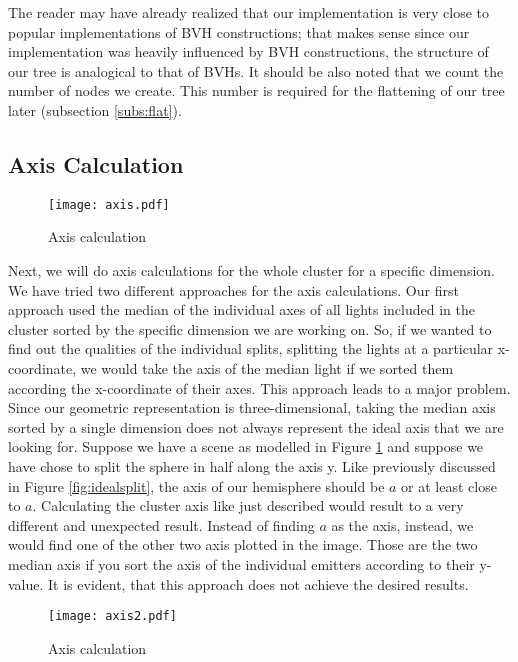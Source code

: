 The reader may have already realized that our implementation is very close to popular implementations of BVH constructions; that makes sense since our implementation was heavily influenced by BVH constructions, the structure of our tree is analogical to that of BVHs. It should be also noted that we count the number of nodes we create. This number is required for the flattening of our tree later (subsection \ref{subs:flat}).

\subsection{Axis Calculation}
\label{subs:axis}

\begin{figure}
	\begin{center}
		\texttt{[image: axis.pdf]}
		\caption{Axis calculation}
		\label{fig:axis}
	\end{center}
\end{figure}

Next, we will do axis calculations for the whole cluster for a specific dimension. We have tried two different approaches for the axis calculations. Our first approach used the median of the individual axes of all lights included in the cluster sorted by the specific dimension we are working on. So, if we wanted to find out the qualities of the individual splits, splitting the lights at a particular x-coordinate, we would take the axis of the median light if we sorted them according the x-coordinate of their axes. This approach leads to a major problem. Since our geometric representation is three-dimensional, taking the median axis sorted by a single dimension does not always represent the ideal axis that we are looking for. Suppose we have a scene as modelled in Figure \ref{fig:axis} and suppose we have chose to split the sphere in half along the axis y. Like previously discussed in Figure \ref{fig:idealsplit}, the axis of our hemisphere should be $a$ or at least close to $a$. Calculating the cluster axis like just described would result to a very different and unexpected result. Instead of finding $a$ as the axis, instead, we would find one of the other two axis plotted in the image. Those are the two median axis if you sort the axis of the individual emitters according to their y-value. It is evident, that this approach does not achieve the desired results. 

\begin{figure}
	\begin{center}
		\texttt{[image: axis2.pdf]}
		\caption{Axis calculation}
		\label{fig:axis2}
	\end{center}
\end{figure}


